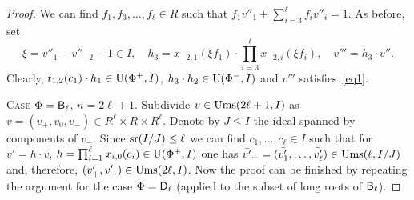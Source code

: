 \begin{proof}
We can find $f_1, f_3,\ldots, f_\ell \in R$ such that $f_1v''_1+\sum_{i=3}^\ell f_i v''_{i} = 1$.
As before, set
\[ \xi = v''_1-v''_{-2}-1 \in I, \quad h_3 = x_{-2,1}(\xi f_1) \cdot \prod_{i=3}^\ell x_{-2,i}(\xi f_i), \quad v'''=h_3 \cdot v''. \]
Clearly, $t_{1,2}(c_1) \cdot h_1 \in \operatorname{U}(\Phi^+, I)$, $ h_3 \cdot h_2 \in \operatorname{U}(\Phi^-, I)$ and $v'''$ satisfies~\eqref{eq1}.

\textsc{Case $\Phi=\mathsf{B}_\ell$, $n=2\ell+1$.} Subdivide $v\in \operatorname{Ums}(2\ell+1, I)$ as $v=(v_+, v_0, v_-)\in R^\ell\times R\times R^\ell$.
Denote by $J\leq I$ the ideal spanned by components of $v_-$.
Since $\operatorname{sr}(I/J)\leq \ell$ we can find $c_1,\dots,c_\ell\in I$ such that for $v' = h \cdot v$, $h = \prod_{i=1}^\ell x_{i,0}(c_i) \in \operatorname{U}(\Phi^+, I)$
one has $\bar{v'}_+=(\bar{v'_1},\ldots, \bar{v'_\ell}) \in \operatorname{Ums}(\ell, I/J)$ and, therefore, $(v'_+, v'_-) \in \operatorname{Ums}(2\ell, I)$.
Now the proof can be finished by repeating the argument for the case $\Phi=\mathsf{D}_\ell$ (applied to the subset of long roots of $\mathsf{B}_\ell$).
\end{proof}

